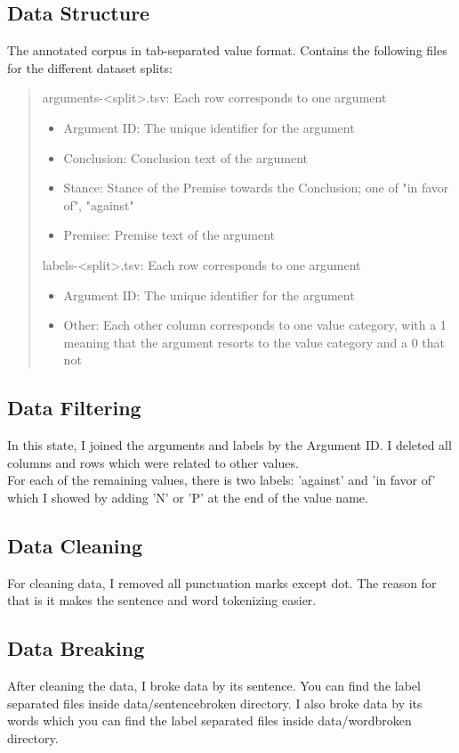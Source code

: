 \subsection{Data Structure}
The annotated corpus in tab-separated value format. Contains the following files for the different dataset splits: \\
\begin{quote}
	arguments-<split>.tsv: Each row corresponds to one argument
	\begin{itemize}
		\item Argument ID: The unique identifier for the argument
		\item Conclusion: Conclusion text of the argument
		\item Stance: Stance of the Premise towards the Conclusion; one of "in favor of", "against"
		\item Premise: Premise text of the argument
	\end{itemize}
	
	labels-<split>.tsv: Each row corresponds to one argument
	\begin{itemize}
		\item Argument ID: The unique identifier for the argument
		\item Other: Each other column corresponds to one value category, with a 1 meaning that the argument resorts to the value category and a 0 that not
	\end{itemize}
\end{quote}

\subsection{Data Filtering}
In this state, I joined the arguments and labels by the Argument ID. I deleted all columns and rows which were related to other values. \\
For each of the remaining values, there is two labels: 'against' and 'in favor of' which I showed by adding 'N' or 'P' at the end of the value name. \\

\subsection{Data Cleaning}
For cleaning data, I removed all punctuation marks except dot. The reason for that is it makes the sentence and word tokenizing easier. \\

\subsection{Data Breaking}
After cleaning the data, I broke data by its sentence. You can find the label separated files inside data/sentencebroken directory. I also
broke data by its words which you can find the label separated files inside data/wordbroken directory. \\

